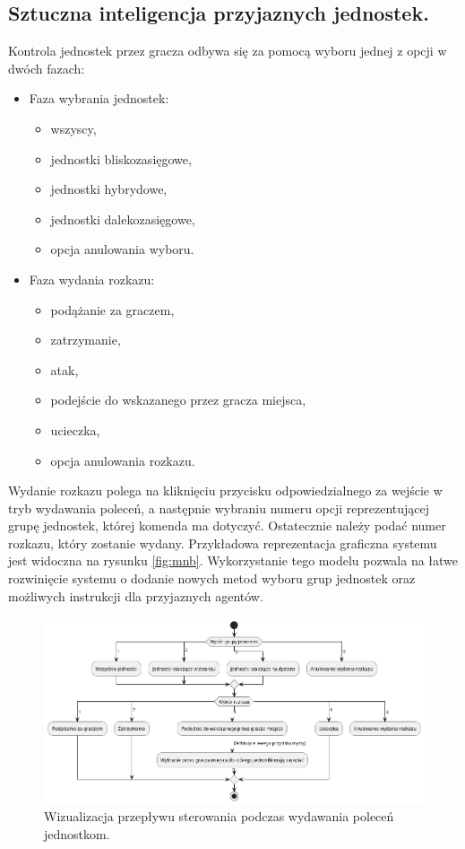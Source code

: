 \subsection{Sztuczna inteligencja przyjaznych jednostek.}

Kontrola jednostek przez gracza odbywa się za pomocą wyboru jednej z opcji w dwóch fazach: 
\begin{itemize}
\item Faza wybrania jednostek:
  \begin{itemize}
    \item wszyscy,
    \item jednostki bliskozasięgowe,
    \item jednostki hybrydowe,
    \item jednostki dalekozasięgowe,
    \item opcja anulowania wyboru.
  \end{itemize}

\item Faza wydania rozkazu:
  \begin{itemize}
    \item podążanie za graczem,
    \item zatrzymanie,
    \item atak,
    \item podejście do wskazanego przez gracza miejsca,
    \item ucieczka,
    \item opcja anulowania rozkazu.
  \end{itemize}
\end{itemize}

Wydanie rozkazu polega na kliknięciu przycisku odpowiedzialnego za wejście w tryb wydawania poleceń, a następnie
wybraniu numeru opcji reprezentującej grupę jednostek, której komenda ma dotyczyć. Ostatecznie należy podać numer rozkazu, który zostanie wydany.
Przykładowa reprezentacja graficzna systemu jest widoczna na rysunku \ref{fig:mnb}.
Wykorzystanie tego modelu pozwala na łatwe rozwinięcie systemu o dodanie nowych metod wyboru grup jednostek oraz możliwych instrukcji dla przyjaznych agentów.

\begin{figure}[h]
\centering
\includegraphics[width=1\textwidth]{uml/commands}
\caption{Wizualizacja przepływu sterowania podczas wydawania poleceń jednostkom.}
\end{figure}
